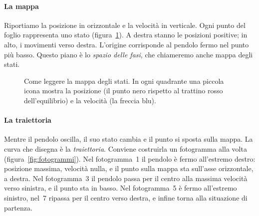 \documentclass[11pt,a4paper,twoside=false,headinclude,footinclude]{scrartcl}
\begin{document}
\paragraph{La mappa} Riportiamo la posizione in orizzontale e la velocità in verticale. Ogni punto del foglio rappresenta uno stato (figura~\ref{fig:leggere}). A destra stanno le posizioni positive; in alto, i movimenti verso destra. L'origine corrisponde al pendolo fermo nel punto più basso. Questo piano è lo \emph{spazio delle fasi}, che chiameremo anche mappa degli stati.

\begin{figure}[htbp]
\centering
{}
\caption{Come leggere la mappa degli stati. In ogni quadrante una piccola icona mostra la posizione (il punto nero rispetto al trattino rosso dell'equilibrio) e la velocità (la freccia blu).}
\label{fig:leggere}
\end{figure}

\paragraph{La traiettoria} Mentre il pendolo oscilla, il suo stato cambia e il punto si sposta sulla mappa. La curva che disegna è la \emph{traiettoria}. Conviene costruirla un fotogramma alla volta (figura~\ref{fig:fotogrammi}). Nel fotogramma~1 il pendolo è fermo all'estremo destro: posizione massima, velocità nulla, e il punto sulla mappa sta sull'asse orizzontale, a destra. Nel fotogramma~3 il pendolo passa per il centro alla massima velocità verso sinistra, e il punto sta in basso. Nel fotogramma~5 è fermo all'estremo sinistro, nel~7 ripassa per il centro verso destra, e infine torna alla situazione di partenza.
\end{document}
